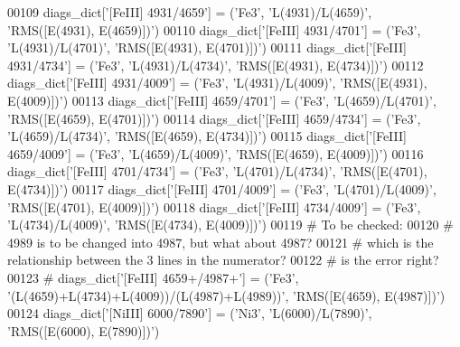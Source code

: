 \begin{DoxyCode}
00109 diags\_dict[\textcolor{stringliteral}{'[FeIII] 4931/4659'}] = (\textcolor{stringliteral}{'Fe3'}, \textcolor{stringliteral}{'L(4931)/L(4659)'}, \textcolor{stringliteral}{'RMS([E(4931), E(4659)])'})
00110 diags\_dict[\textcolor{stringliteral}{'[FeIII] 4931/4701'}] = (\textcolor{stringliteral}{'Fe3'}, \textcolor{stringliteral}{'L(4931)/L(4701)'}, \textcolor{stringliteral}{'RMS([E(4931), E(4701)])'})
00111 diags\_dict[\textcolor{stringliteral}{'[FeIII] 4931/4734'}] = (\textcolor{stringliteral}{'Fe3'}, \textcolor{stringliteral}{'L(4931)/L(4734)'}, \textcolor{stringliteral}{'RMS([E(4931), E(4734)])'})
00112 diags\_dict[\textcolor{stringliteral}{'[FeIII] 4931/4009'}] = (\textcolor{stringliteral}{'Fe3'}, \textcolor{stringliteral}{'L(4931)/L(4009)'}, \textcolor{stringliteral}{'RMS([E(4931), E(4009)])'})
00113 diags\_dict[\textcolor{stringliteral}{'[FeIII] 4659/4701'}] = (\textcolor{stringliteral}{'Fe3'}, \textcolor{stringliteral}{'L(4659)/L(4701)'}, \textcolor{stringliteral}{'RMS([E(4659), E(4701)])'})
00114 diags\_dict[\textcolor{stringliteral}{'[FeIII] 4659/4734'}] = (\textcolor{stringliteral}{'Fe3'}, \textcolor{stringliteral}{'L(4659)/L(4734)'}, \textcolor{stringliteral}{'RMS([E(4659), E(4734)])'})
00115 diags\_dict[\textcolor{stringliteral}{'[FeIII] 4659/4009'}] = (\textcolor{stringliteral}{'Fe3'}, \textcolor{stringliteral}{'L(4659)/L(4009)'}, \textcolor{stringliteral}{'RMS([E(4659), E(4009)])'})
00116 diags\_dict[\textcolor{stringliteral}{'[FeIII] 4701/4734'}] = (\textcolor{stringliteral}{'Fe3'}, \textcolor{stringliteral}{'L(4701)/L(4734)'}, \textcolor{stringliteral}{'RMS([E(4701), E(4734)])'})
00117 diags\_dict[\textcolor{stringliteral}{'[FeIII] 4701/4009'}] = (\textcolor{stringliteral}{'Fe3'}, \textcolor{stringliteral}{'L(4701)/L(4009)'}, \textcolor{stringliteral}{'RMS([E(4701), E(4009)])'})
00118 diags\_dict[\textcolor{stringliteral}{'[FeIII] 4734/4009'}] = (\textcolor{stringliteral}{'Fe3'}, \textcolor{stringliteral}{'L(4734)/L(4009)'}, \textcolor{stringliteral}{'RMS([E(4734), E(4009)])'})
00119 \textcolor{comment}{# To be checked:}
00120 \textcolor{comment}{# 4989 is to be changed into 4987, but what about 4987?}
00121 \textcolor{comment}{# which is the relationship between the 3 lines in the numerator?}
00122 \textcolor{comment}{# is the error right?}
00123 \textcolor{comment}{# diags\_dict['[FeIII] 4659+/4987+'] = ('Fe3', '(L(4659)+L(4734)+L(4009))/(L(4987)+L(4989))', 'RMS([E(4659),
       E(4987)])')}
00124 diags\_dict[\textcolor{stringliteral}{'[NiIII] 6000/7890'}] = (\textcolor{stringliteral}{'Ni3'}, \textcolor{stringliteral}{'L(6000)/L(7890)'}, \textcolor{stringliteral}{'RMS([E(6000), E(7890)])'})

\end{DoxyCode}
